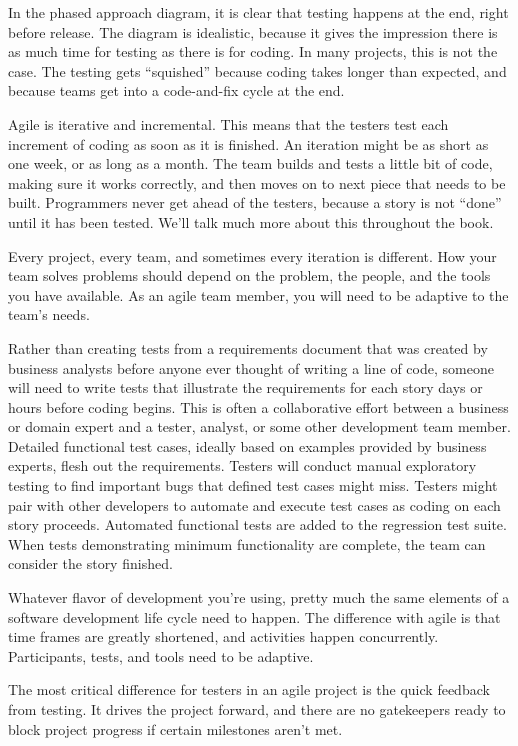 \documentclass[
	12pt,				%
	openright,			%
	oneside,			%
	a4paper,			%
	english,			%
	brazil,				%
	]{abntex2}
\begin{document}
In the phased approach diagram, it is clear that testing happens at the end, right before release. The diagram is idealistic, because it gives the impression there is as much time for testing as there is for coding. In many projects, this is not the case. The testing gets “squished” because coding takes longer than expected, and because teams get into a code-and-fix cycle at the end.

Agile is iterative and incremental. This means that the testers test each increment of coding as soon as it is finished. An iteration might be as short as one week, or as long as a month. The team builds and tests a little bit of code, making sure it works correctly, and then moves on to next piece that needs to be built. Programmers never get ahead of the testers, because a story is not “done” until it has been tested. We’ll talk much more about this throughout the book.

Every project, every team, and sometimes every iteration is different. How your team solves problems should depend on the problem, the people, and the tools you have available. As an agile team member, you will need to be adaptive to the team’s needs.

Rather than creating tests from a requirements document that was created by business analysts before anyone ever thought of writing a line of code, someone will need to write tests that illustrate the requirements for each story days or hours before coding begins. This is often a collaborative effort between a business or domain expert and a tester, analyst, or some other development team member. Detailed functional test cases, ideally based on examples provided by business experts, flesh out the requirements. Testers will conduct manual exploratory testing to find important bugs that defined test cases might miss. Testers might pair with other developers to automate and execute test cases as coding on each story proceeds. Automated functional tests are added to the regression test suite. When tests demonstrating minimum functionality are complete, the team can consider the story finished.

Whatever flavor of development you’re using, pretty much the same elements of a software development life cycle need to happen. The difference with agile is that time frames are greatly shortened, and activities happen concurrently. Participants, tests, and tools need to be adaptive.

The most critical difference for testers in an agile project is the quick feedback from testing. It drives the project forward, and there are no gatekeepers ready to block project progress if certain milestones aren’t met.
\end{document}
